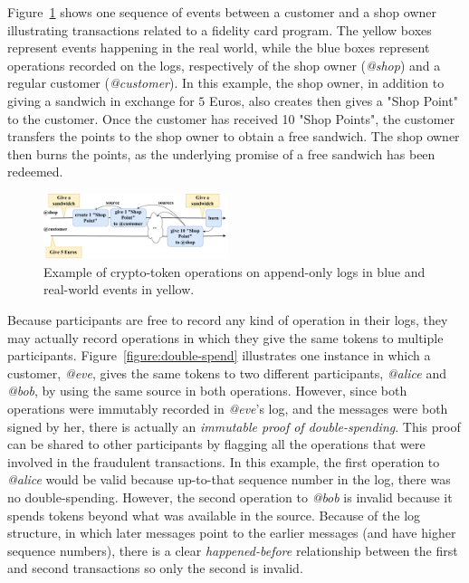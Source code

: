 \documentclass[sigconf,9pt]{acmart}
\begin{document}
Figure~\ref{figure:example} shows one sequence of events between a customer and a shop owner illustrating transactions related to a fidelity card program.  The yellow boxes represent events happening in the real world, while the blue boxes represent operations recorded on the logs, respectively of the shop owner (\textit{@shop}) and a regular customer (\textit{@customer}). In this example, the shop owner, in addition to giving a sandwich in exchange for $5$ Euros, also creates then gives  a "Shop Point" to the customer. Once the customer has received 10 "Shop Points", the customer transfers the points to the shop owner to obtain a free sandwich. The shop owner then burns the points, as the underlying promise of a free sandwich has been redeemed.

\begin{figure}[htbp]
\centering
\includegraphics[width=0.48\textwidth]{./figures/example-drawio}
\caption{Example of crypto-token operations on append-only logs in blue and real-world events in yellow.}
\label{figure:example}
\end{figure}

Because participants are free to record any kind of operation in their logs, they may actually record operations in which they give the same tokens to multiple participants. Figure~\ref{figure:double-spend} illustrates one instance in which a customer, \textit{@eve}, gives the same tokens to two different participants, \textit{@alice} and \textit{@bob}, by using the same source in both operations. However, since both operations were immutably recorded in \textit{@eve}'s log, and the messages were both signed by her, there is actually an \textit{immutable proof of double-spending}. This proof can be shared to other participants by flagging all the operations that were involved in the fraudulent transactions. In this example, the first operation to \textit{@alice} would be valid because up-to-that sequence number in the log, there was no double-spending. However, the second operation to \textit{@bob} is  invalid because it spends tokens beyond what was available in the source. Because of the log structure, in which later messages point to the earlier messages (and have higher sequence numbers), there is a clear \textit{happened-before} relationship between the first and second transactions so only the second is invalid.
\end{document}
